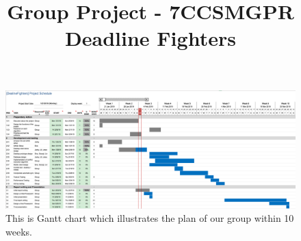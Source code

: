 \documentclass[a4paper]{article}
\title{Group Project - 7CCSMGPR \hspace{0.5 cm}Deadline Fighters}
\begin{document}
{

\newpage





\medskip


\begin{figure}
\includegraphics[scale=0.4]{Timeline_Ver_0}
\caption{This is Gantt chart which illustrates the plan of our group within 10 weeks.}
\end{figure}
}
\end{document}
